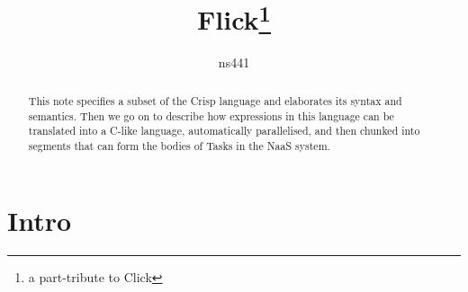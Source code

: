 \documentclass{article}
\begin{document}
\title{Flick\thanks{a part-tribute to Click}}
\author{ns441}

\maketitle

\begin{abstract}
This note specifies a subset of the Crisp language and elaborates its syntax and
semantics. Then we go on to describe how expressions in this language can be
translated into a C-like language, automatically parallelised, and then chunked
into segments that can form the bodies of Tasks in the NaaS system.
\end{abstract}

\tableofcontents

\section{Intro}
\end{document}
